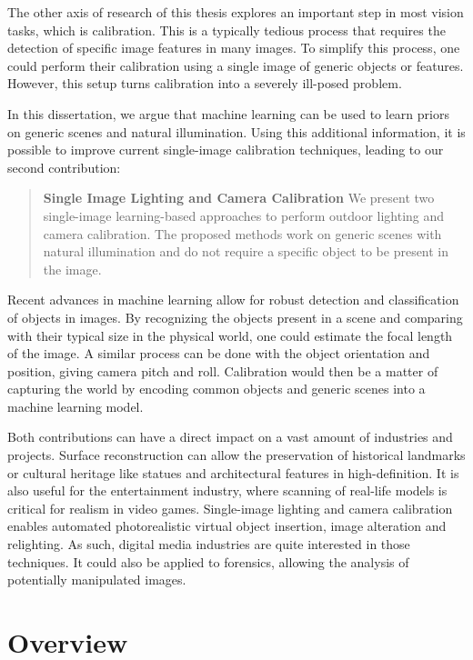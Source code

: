 The other axis of research of this thesis explores an important step in most vision tasks, which is calibration. This is a typically tedious process that requires the detection of specific image features in many images. To simplify this process, one could perform their calibration using a single image of generic objects or features. However, this setup turns calibration into a severely ill-posed problem.

In this dissertation, we argue that machine learning can be used to learn priors on generic scenes and natural illumination. Using this additional information, it is possible to improve current single-image calibration techniques, leading to our second contribution:
\begin{quotation}
\textbf{Single Image Lighting and Camera Calibration} We present two single-image learning-based approaches to perform outdoor lighting and camera calibration. The proposed methods work on generic scenes with natural illumination and do not require a specific object to be present in the image.
\end{quotation}

Recent advances in machine learning allow for robust detection and classification of objects in images. By recognizing the objects present in a scene and comparing with their typical size in the physical world, one could estimate the focal length of the image. A similar process can be done with the object orientation and position, giving camera pitch and roll. Calibration would then be a matter of capturing the world by encoding common objects and generic scenes into a machine learning model.

Both contributions can have a direct impact on a vast amount of industries and projects. Surface reconstruction can allow the preservation of historical landmarks or cultural heritage like statues and architectural features in high-definition. It is also useful for the entertainment industry, where scanning of real-life models is critical for realism in video games. Single-image lighting and camera calibration enables automated photorealistic virtual object insertion, image alteration and relighting. As such, digital media industries are quite interested in those techniques. It could also be applied to forensics, allowing the analysis of potentially manipulated images.

\section*{Overview}

